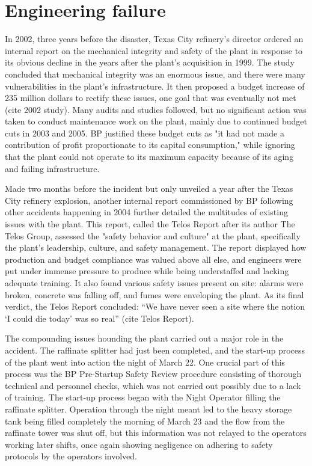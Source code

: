 \documentclass[12pt]{article}
\begin{document}
	\section*{Engineering failure}
	In 2002, three years before the disaster, Texas City refinery's director ordered an internal report on the mechanical integrity and safety of the plant in response to its obvious decline in the years after the plant's acquisition in 1999. The study concluded that mechanical integrity was an enormous issue, and there were many vulnerabilities in the plant's infrastructure. It then proposed a budget increase of 235 million dollars to rectify these issues, one goal that was eventually not met (cite 2002 study). Many audits and studies followed, but no significant action was taken to conduct maintenance work on the plant, mainly due to continued budget cuts in 2003 and 2005. BP justified these budget cuts as "it had not made a contribution of profit proportionate to its capital consumption," while ignoring that the plant could not operate to its maximum capacity because of its aging and failing infrastructure.
	
	Made two months before the incident but only unveiled a year after the Texas City refinery explosion, another internal report commissioned by BP following other accidents happening in 2004 further detailed the multitudes of existing issues with the plant. This report, called the Telos Report after its author The Telos Group, assessed the "safety behavior and culture" at the plant, specifically the plant's leadership, culture, and safety management. The report displayed how production and budget compliance was valued above all else, and engineers were put under immense pressure to produce while being understaffed and lacking adequate training. It also found various safety issues present on site: alarms were broken, concrete was falling off, and fumes were enveloping the plant. As its final verdict, the Telos Report concluded: “We have never seen a site where the notion ‘I could die today’ was so real” (cite Telos Report).
	
	 The compounding issues hounding the plant carried out a major role in the accident. The raffinate splitter had just been completed, and the start-up process of the plant went into action the night of March 22. One crucial part of this process was the BP Pre-Startup Safety Review procedure consisting of thorough technical and personnel checks, which was not carried out possibly due to a lack of training. The start-up process began with the Night Operator filling the raffinate splitter. Operation through the night meant led to the heavy storage tank being filled completely the morning of March 23 and the flow from the raffinate tower was shut off, but this information was not relayed to the operators working later shifts, once again showing negligence on adhering to safety protocols by the operators involved. 
	 
\end{document}
